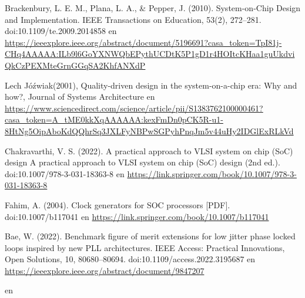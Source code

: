 \documentclass[runningheads,a4paper]{llncs}
\begin{document}
\break
\begin{thebibliography}{4}
     Brackenbury, L. E. M., Plana, L. A., & Pepper, J. (2010). System-on-Chip Design and Implementation. IEEE Transactions on Education, 53(2), 272–281. doi:10.1109/te.2009.2014858 en \url{https://ieeexplore.ieee.org/abstract/document/5196691?casa_token=TpI81j-CHq4AAAAA:ILb9l6GoYXNWQbEPythUCDtK5P1gD1r4HOItcKHaa1guUkdviQkCzPEXMteGrnGGqSA2KhfANXdP}

     Lech Jóźwiak(2001), Quality-driven design in the system-on-a-chip era: Why and how?, Journal of Systems Architecture en \url{https://www.sciencedirect.com/science/article/pii/S1383762100000461?casa_token=A_tME0kkXqAAAAAA:kexFmDn0pCK5R-u1-8HtNg5OipAboKdQQhrSq3JXLFyNBPwSGPyhPnqJm5v44uHy2IDGlExRLkVd}

     Chakravarthi, V. S. (2022). A practical approach to VLSI system on chip (SoC) design A practical approach to VLSI system on chip (SoC) design (2nd ed.). doi:10.1007/978-3-031-18363-8 en \url{https://link.springer.com/book/10.1007/978-3-031-18363-8}

     Fahim, A. (2004). Clock generators for SOC processors [PDF]. doi:10.1007/b117041 en \url{https://link.springer.com/book/10.1007/b117041}

     Bae, W. (2022). Benchmark figure of merit extensions for low jitter phase locked loops inspired by new PLL architectures. IEEE Access: Practical Innovations, Open Solutions, 10, 80680–80694. doi:10.1109/access.2022.3195687 en \url{https://ieeexplore.ieee.org/abstract/document/9847207}

      en \url{}

\end{thebibliography}
\printbibliography
\end{document}
